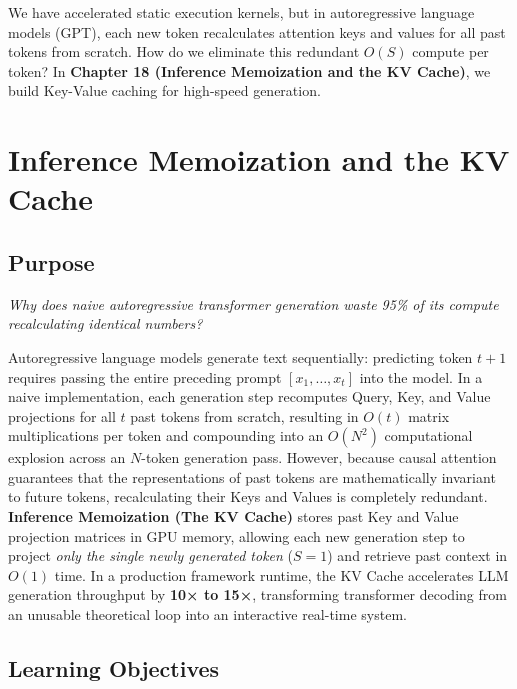 \documentclass[
  letterpaper,
]{scrbook}
\begin{document}
We have accelerated static execution kernels, but in autoregressive
language models (GPT), each new token recalculates attention keys and
values for all past tokens from scratch. How do we eliminate this
redundant \(O(S)\) compute per token? In \textbf{Chapter 18 (Inference
Memoization and the KV Cache)}, we build Key-Value caching for
high-speed generation.

\chapter{Inference Memoization and the KV
Cache}\label{inference-memoization-and-the-kv-cache}

\section*{Purpose}\label{purpose-20}


\emph{Why does naive autoregressive transformer generation waste 95\% of
its compute recalculating identical numbers?}

Autoregressive language models generate text sequentially: predicting
token \(t+1\) requires passing the entire preceding prompt
\([x_1, \dots, x_t]\) into the model. In a naive implementation, each
generation step recomputes Query, Key, and Value projections for all
\(t\) past tokens from scratch, resulting in \(O(t)\) matrix
multiplications per token and compounding into an \(O(N^2)\)
computational explosion across an \(N\)-token generation pass. However,
because causal attention guarantees that the representations of past
tokens are mathematically invariant to future tokens, recalculating
their Keys and Values is completely redundant. \textbf{Inference
Memoization (The KV Cache)} stores past Key and Value projection
matrices in GPU memory, allowing each new generation step to project
\emph{only the single newly generated token} (\(S=1\)) and retrieve past
context in \(O(1)\) time. In a production framework runtime, the KV
Cache accelerates LLM generation throughput by \textbf{10× to 15×},
transforming transformer decoding from an unusable theoretical loop into
an interactive real-time system.

\section{Learning Objectives}\label{learning-objectives-18}
\end{document}

